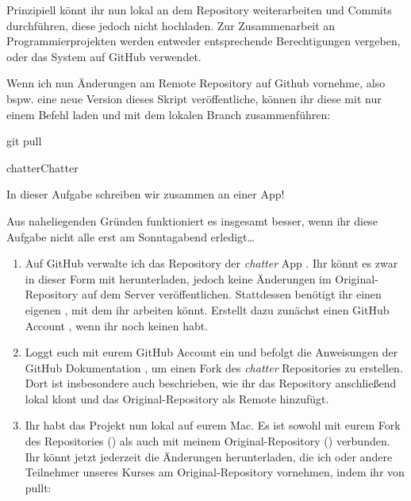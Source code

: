 \documentclass[parskip=half, final]{scrreprt}
\begin{document}
\begin{lecture}
\begin{enumerate}
Prinzipiell könnt ihr nun lokal an dem Repository weiterarbeiten und Commits durchführen, diese jedoch nicht hochladen. Zur Zusammenarbeit an Programmierprojekten werden entweder entsprechende Berechtigungen vergeben, oder das  System auf GitHub verwendet.

Wenn ich nun Änderungen am Remote Repository auf Github vornehme, also bspw. eine neue Version dieses Skript veröffentliche, können ihr diese mit nur einem Befehl laden und mit dem lokalen  Branch zusammenführen:

\begin{shlst}
git pull
\end{shlst}

\end{enumerate}

\begin{exc}

\begin{excitem}{chatter}{Chatter}

In dieser Aufgabe schreiben wir zusammen an einer App!

\begin{exchinweis}
Aus naheliegenden Gründen funktioniert es insgesamt besser, wenn ihr diese Aufgabe nicht alle erst am Sonntagabend erledigt…
\end{exchinweis}

\begin{enumerate}[label=\roman*.]

\item Auf GitHub verwalte ich das Repository der \emph{chatter} App . Ihr könnt es zwar in dieser Form mit  herunterladen, jedoch keine Änderungen im Original-Repository auf dem Server veröffentlichen. Stattdessen benötigt ihr einen eigenen , mit dem ihr arbeiten könnt. Erstellt dazu zunächst einen GitHub Account , wenn ihr noch keinen habt.

\item Loggt euch mit eurem GitHub Account ein und befolgt die Anweisungen der GitHub Dokumentation , um einen Fork des \emph{chatter} Repositories  zu erstellen. Dort ist insbesondere auch beschrieben, wie ihr das Repository anschließend lokal klont und das Original-Repository als Remote  hinzufügt.

\item Ihr habt das Projekt nun lokal auf eurem Mac. Es ist sowohl mit eurem Fork des Repositories () als auch mit meinem Original-Repository () verbunden. Ihr könnt jetzt jederzeit die Änderungen herunterladen, die ich oder andere Teilnehmer unseres Kurses am Original-Repository vornehmen, indem ihr von  pullt:


\end{enumerate}
\end{excitem}
\end{exc}
\end{lecture}
\end{document}
